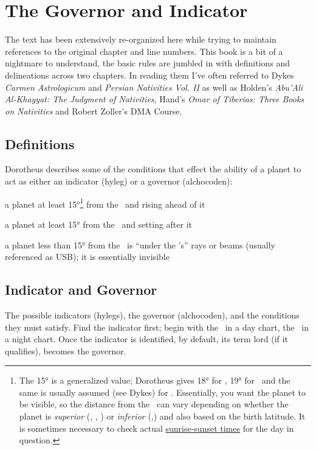\section{The Governor and Indicator}
\begin{mdframed}[backgroundcolor=cyan!5, rightmargin=1em, leftmargin=1em]
The text has been extensively re-organized here while trying to maintain references to the original chapter and line numbers. This  book is a bit of a nightmare to understand, the basic rules are jumbled in with definitions and delineations across two chapters. In reading them I've often referred to Dykes \textsl{Carmen Astrologicum} and \textsl{Persian Nativities Vol. II} as well as Holden's \textsl{Abu'Ali Al-Khayyat: The Judgment of Nativities}, Hand's \textsl{Omar of Tiberias: Three Books on Nativities} and Robert Zoller's DMA Course.
\end{mdframed}

\subsection{Definitions}
Dorotheus describes some of the conditions that effect the ability of a planet to act as either an indicator (hyleg) or a governor (alchocoden):
\begin{description}[style=multiline,leftmargin=5em]
\item[Eastern]a planet at least 15°\footnote{The 15° is a generalized value; Dorotheus gives 18° for \Mars, 19° for \Mercury\, and the same is usually assumed (see Dykes) for \Venus. Essentially, you want the planet to be visible, so the distance from the \Sun\, can vary depending on whether the planet is \textsl{superior} (\Saturn, \Jupiter, \Mars) or \textsl{inferior} (\Venus,\Mercury) and also based on the birth latitude. It is sometimes necessary to check actual \href{https://www.sunrise-and-sunset.com/en/sun}{sunrise-sunset times} for the day in question.} from the \Sun\, and rising ahead of it
\item[Western ]a planet at least 15° from the \Sun\, and setting after it
\item[USB] a planet less than 15° from the \Sun\, is ``under the \Sun's'' rays or beams (usually referenced as USB); it is essentially invisible
\end{description}

\subsection{Indicator and Governor}
The possible indicators (hylegs), the governor (alchocoden), and the conditions they must satisfy. Find the indicator first; begin with the \Sun\, in a day chart, the \Moon\, in a night chart. Once the indicator is identified, by default, its term lord (if it qualifies), becomes the governor.

